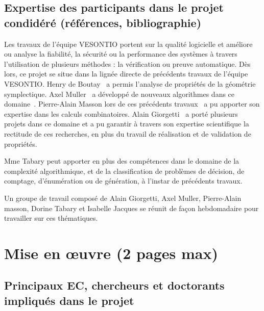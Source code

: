 \documentclass[10pt, a4paper, french]{article}
\begin{document}
\subsection{Expertise des participants dans le projet condidéré (références, bibliographie)}

Les travaux de l'équipe VESONTIO portent sur la qualité logicielle et améliore ou analyse la fiabilité, la sécurité ou la performance des systèmes à travers l'utilisation de plusieurs méthodes : la vérification ou preuve automatique. Dès lors, ce projet se situe dans la lignée directe de précédents travaux de l'équipe VESONTIO. Henry de Boutay~\cite{MULLER2022101853, de2022contextuality, contextAG} a permis l'analyse de propriétés de la géométrie symplectique. Axel Muller~\cite{MULLER2022101853, contextAG} a développé de nouveaux algorithmes dans ce domaine~\cite{MULLER2022101853, contextAG}. Pierre-Alain Masson lors de ces précédents travaux~\cite{de2022contextuality, de2021mermin} a pu apporter son expertise dans les calculs combinatoires. Alain Giorgetti~\cite{MULLER2022101853, de2022contextuality, contextAG, de2021mermin} a porté plusieurs projets dans ce domaine et a pu garantir à travers son expertise scientifique la rectitude de ces recherches, en plus du travail de réalisation et de validation de propriétés.

Mme Tabary peut apporter en plus des compétences dans le domaine de la complexité algorithmique, et de la classification de problèmes de décision, de comptage, d'énumération ou de génération, à l'instar de précédents travaux\cite{TomDavot}.

Un groupe de travail composé de Alain Giorgetti, Axel Muller, Pierre-Alain masson,  Dorine Tabary et Isabelle Jacques se réunit de façon hebdomadaire pour travailler sur ces thématiques.  




\newpage
\section{Mise en œuvre (2 pages max)}
\subsection{Principaux EC, chercheurs et doctorants impliqués dans le projet}
\end{document}
